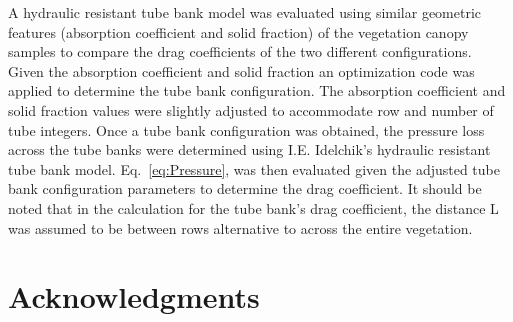 \documentclass[12pt]{article}
\begin{document}
A hydraulic resistant tube bank model was evaluated using similar geometric features (absorption coefficient and solid fraction) of the vegetation canopy samples to compare the drag coefficients of the two different configurations. Given the absorption coefficient and solid fraction an optimization code was applied to determine the tube bank configuration. The absorption coefficient and solid fraction values were slightly adjusted to accommodate row and number of tube integers. Once a tube bank configuration was obtained, the pressure loss across the tube banks were determined using I.E. Idelchik's hydraulic resistant tube bank model.  Eq.~\ref{eq:Pressure}, was then evaluated given the adjusted tube bank configuration parameters to determine the drag coefficient. It should be noted that in the calculation for the tube bank's drag coefficient, the distance L was assumed to be between rows alternative to across the entire vegetation.\\




\pagebreak

\section*{Acknowledgments}
\end{document}
